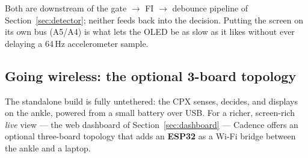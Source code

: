 Both are downstream of the gate \(\rightarrow\) FI \(\rightarrow\) debounce pipeline of
Section~\ref{sec:detector}; neither feeds back into the decision. Putting the screen on
its own bus (A5/A4) is what lets the OLED be as slow as it likes without ever delaying a
64\,Hz accelerometer sample.

\subsection{Going wireless: the optional 3-board topology}

The standalone build is fully untethered: the CPX senses, decides, and displays on the
ankle, powered from a small battery over USB. For a richer, screen-rich \emph{live}
view --- the web dashboard of Section~\ref{sec:dashboard} --- Cadence offers an optional
three-board topology that adds an \textbf{ESP32} as a Wi-Fi bridge between the ankle and
a laptop.

